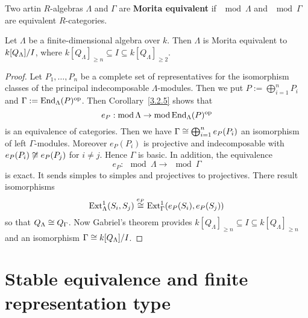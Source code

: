 \begin{definition}
  Two artin $R$-algebras  $\Lambda$ and $\Gamma$ are \textbf{Morita equivalent} if $\mod \Lambda$ and $\mod \Gamma$
  are equivalent $R$-categories.
\end{definition}


\begin{corollary}\label{3.2.8}
  Let $\Lambda$ be a finite-dimensional algebra over $k$. Then $\Lambda$ is Morita
  equivalent to $k[Q_\Lambda]/I$, where $k[Q_\Lambda]_{\geq n} \subseteq I \subseteq k[Q_\Lambda]_{\geq 2}$.
\end{corollary}


\begin{proof}
  Let $P_1, \ldots, P_n$ be a complete set of representatives for the isomorphism
  classes of the principal indecomposable $\Lambda$-modules. Then we put $P :=
  \bigoplus_{i=1}^n P_i$ and $\Gamma:=\operatorname{End}_\Lambda(P)^{\mathrm{op}}$. Then Corollary~\ref{3.2.5} shows that
    \[ e_P : \operatorname{mod} \Lambda \to \operatorname{mod}{\operatorname{End}_\Lambda(P)^{\mathrm{op}}} \]
  is an equivalence of categories.
  Then we have $\Gamma \cong \bigoplus_{i=1}^ne_P(P_i)$ an isomorphism of left $\Gamma$-modules.
  Moreover $e_P(P_i)$ is projective and indecomposable with $e_P(P_i) \not\cong e_P(P_j)$ for $i
  \neq j$. Hence $\Gamma$ is basic.
  In addition, the equivalence
    \[ e_P : \mod \Lambda \to \mod \Gamma \]
  is exact. It sends simples to simples and projectives to projectives. There
  result isomorphisms
    \[ \operatorname{Ext}_\Lambda^1(S_i, S_j) \overset{e_P}{\cong} \operatorname{Ext}_\Gamma^1(e_P(S_i), e_P(S_j)) \]
  so that $Q_\Lambda \cong Q_\Gamma$.
  Now Gabriel's theorem provides $k[Q_\Lambda]_{\geq n} \subseteq I \subseteq k[Q_\Lambda]_{\geq n}$ and an
  isomorphism $\Gamma \cong k[Q_\Lambda]/I$.
\end{proof}


\section{Stable equivalence and finite representation type}

